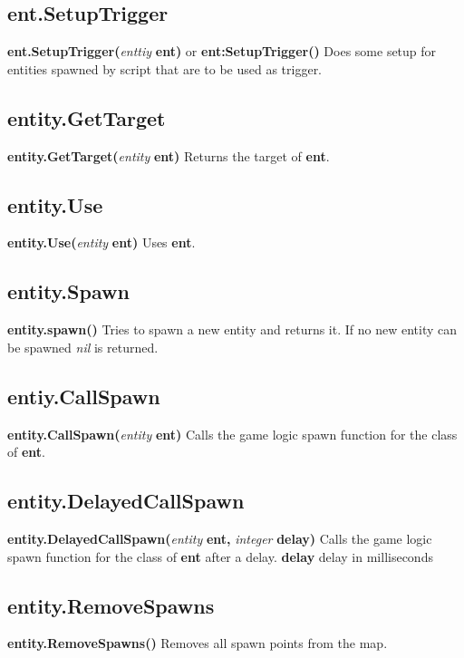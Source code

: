 \documentclass{scrreprt}
\begin{document}
\subsection{ent.SetupTrigger}
\label{enty-setuptrigger}
\textbf{ent.SetupTrigger(}\textit{enttiy}\textbf{ ent)} or \textbf{ent:SetupTrigger()}
\newline
Does some setup for entities spawned by script that are to be used as trigger.
\subsection{entity.GetTarget}
\label{enty-gettarget}
\textbf{entity.GetTarget(}\textit{entity}\textbf{ ent)}
Returns the target of \textbf{ent}.
\subsection{entity.Use}
\label{enty-use}
\textbf{entity.Use(}\textit{entity}\textbf{ ent)}
\newline
Uses \textbf{ent}.
\subsection{entity.Spawn}
\label{enty-spawn}
\textbf{entity.spawn()}
\newline
Tries to spawn a new entity and returns it. If no new entity can be spawned \textit{nil} is returned.
\subsection{entiy.CallSpawn}
\label{enty-callspawn}
\textbf{entity.CallSpawn(}\textit{entity}\textbf{ ent)}
\newline
Calls the game logic spawn function for the class of \textbf{ent}.
\subsection{entity.DelayedCallSpawn}
\label{enty-delayedcallspawn}
\textbf{entity.DelayedCallSpawn(}\textit{entity}\textbf{ ent, }\textit{integer}\textbf{ delay)}
\newline
Calls the game logic spawn function for the class of \textbf{ent} after a delay.
\textbf{delay} delay in milliseconds
\subsection{entity.RemoveSpawns}
\label{enty-removespawns}
\textbf{entity.RemoveSpawns()}
\newline
Removes all spawn points from the map.
\end{document}
